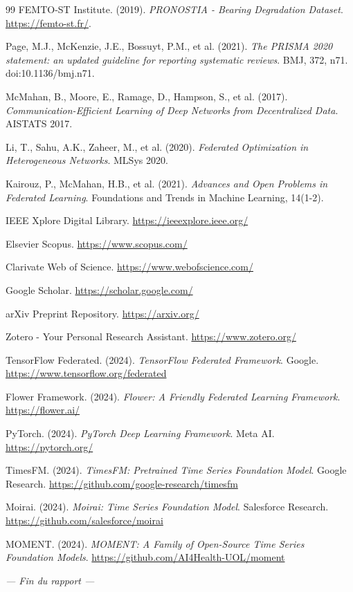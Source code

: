 \documentclass[12pt, a4paper]{report}
\begin{document}
\begin{thebibliography}{99}
FEMTO-ST Institute. (2019).
\newblock \textit{PRONOSTIA - Bearing Degradation Dataset}.
\newblock \url{https://femto-st.fr/}.

Page, M.J., McKenzie, J.E., Bossuyt, P.M., et al. (2021).
\newblock \textit{The PRISMA 2020 statement: an updated guideline for reporting systematic reviews}.
\newblock BMJ, 372, n71. doi:10.1136/bmj.n71.

McMahan, B., Moore, E., Ramage, D., Hampson, S., et al. (2017).
\newblock \textit{Communication-Efficient Learning of Deep Networks from Decentralized Data}.
\newblock AISTATS 2017.

Li, T., Sahu, A.K., Zaheer, M., et al. (2020).
\newblock \textit{Federated Optimization in Heterogeneous Networks}.
\newblock MLSys 2020.

Kairouz, P., McMahan, H.B., et al. (2021).
\newblock \textit{Advances and Open Problems in Federated Learning}.
\newblock Foundations and Trends in Machine Learning, 14(1-2).

IEEE Xplore Digital Library.
\newblock \url{https://ieeexplore.ieee.org/}

Elsevier Scopus.
\newblock \url{https://www.scopus.com/}

Clarivate Web of Science.
\newblock \url{https://www.webofscience.com/}

Google Scholar.
\newblock \url{https://scholar.google.com/}

arXiv Preprint Repository.
\newblock \url{https://arxiv.org/}

Zotero - Your Personal Research Assistant.
\newblock \url{https://www.zotero.org/}

TensorFlow Federated. (2024).
\newblock \textit{TensorFlow Federated Framework}.
\newblock Google. \url{https://www.tensorflow.org/federated}

Flower Framework. (2024).
\newblock \textit{Flower: A Friendly Federated Learning Framework}.
\newblock \url{https://flower.ai/}

PyTorch. (2024).
\newblock \textit{PyTorch Deep Learning Framework}.
\newblock Meta AI. \url{https://pytorch.org/}

TimesFM. (2024).
\newblock \textit{TimesFM: Pretrained Time Series Foundation Model}.
\newblock Google Research. \url{https://github.com/google-research/timesfm}

Moirai. (2024).
\newblock \textit{Moirai: Time Series Foundation Model}.
\newblock Salesforce Research. \url{https://github.com/salesforce/moirai}

MOMENT. (2024).
\newblock \textit{MOMENT: A Family of Open-Source Time Series Foundation Models}.
\newblock \url{https://github.com/AI4Health-UOL/moment}

\end{thebibliography}

\vfill
\begin{center}
\textit{--- Fin du rapport ---}
\end{center}
\end{document}
